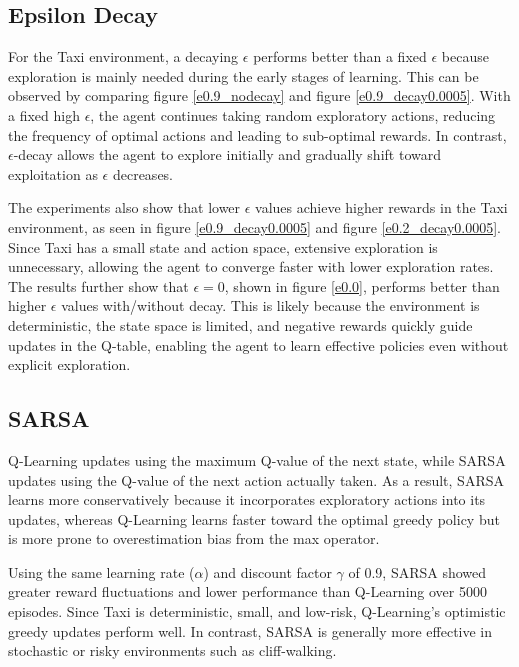 \documentclass[11pt]{article}
\begin{document}
\subsection*{Epsilon Decay}

For the Taxi environment, a decaying $\epsilon$ performs better than a fixed $\epsilon$ because exploration is mainly needed during the early stages of learning. This can be observed by comparing figure \ref{e0.9_nodecay} and figure \ref{e0.9_decay0.0005}. With a fixed high $\epsilon$, the agent continues taking random exploratory actions, reducing the frequency of optimal actions and leading to sub-optimal rewards. In contrast, $\epsilon$-decay allows the agent to explore initially and gradually shift toward exploitation as $\epsilon$ decreases.

The experiments also show that lower $\epsilon$ values achieve higher rewards in the Taxi environment, as seen in figure \ref{e0.9_decay0.0005} and figure \ref{e0.2_decay0.0005}. Since Taxi has a small state and action space, extensive exploration is unnecessary, allowing the agent to converge faster with lower exploration rates. The results further show that $\epsilon = 0$, shown in figure \ref{e0.0}, performs better than higher $\epsilon$ values with/without decay. This is likely because the environment is deterministic, the state space is limited, and negative rewards quickly guide updates in the Q-table, enabling the agent to learn effective policies even without explicit exploration.

\subsection*{SARSA}

Q-Learning updates using the maximum Q-value of the next state, while SARSA updates using the Q-value of the next action actually taken. As a result, SARSA learns more conservatively because it incorporates exploratory actions into its updates, whereas Q-Learning learns faster toward the optimal greedy policy but is more prone to overestimation bias from the max operator.

Using the same learning rate ($\alpha$) and discount factor $\gamma$ of 0.9, SARSA showed greater reward fluctuations and lower performance than Q-Learning over 5000 episodes. Since Taxi is deterministic, small, and low-risk, Q-Learning's optimistic greedy updates perform well. In contrast, SARSA is generally more effective in stochastic or risky environments such as cliff-walking.
\end{document}
